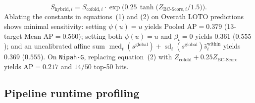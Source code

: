 \documentclass[10pt,twocolumn]{article}
\begin{document}
\begin{equation}
    S_{\text{hybrid},i} = S_{\text{cofold},i} \cdot \exp\!\Big(0.25\,\tanh\!\big(Z_{\text{BC-Score},i} / 1.5\big)\Big).
\end{equation}
Ablating the constants in equations~(1) and (2) on Overath LOTO predictions shows minimal sensitivity: setting $\psi(u) = u$ yields $\text{Pooled AP} = 0.379$ (13-target $\text{Mean AP} = 0.560$); setting both $\psi(u) = u$ and $\beta_t = 0$ yields $0.361$ ($0.555$); and an uncalibrated affine sum $\operatorname{med}_t(s^{\text{global}}) + \operatorname{sd}_t(s^{\text{global}})\hat{s}_i^{\text{within}}$ yields $0.369$ ($0.555$). On \texttt{Nipah-G}, replacing equation~(2) with $Z_{\text{cofold}} + 0.25 Z_{\text{BC-Score}}$ yields $\text{AP} = 0.217$ and $14/50$ top-50 hits.

\subsection{Pipeline runtime profiling}
\end{document}
